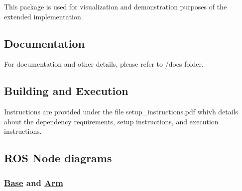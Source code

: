 This package is used for visualization and demonstration purposes of the extended implementation.

\subsection*{Documentation}

For documentation and other details, please refer to /docs folder.

\subsection*{Building and Execution}

Instructions are provided under the file setup\+\_\+instructions.\+pdf whivh details about the dependency requirements, setup instructions, and execution instructions.

\subsection*{R\+OS Node diagrams}

\subsubsection*{\hyperlink{class_base}{Base} and \hyperlink{class_arm}{Arm}}

  
